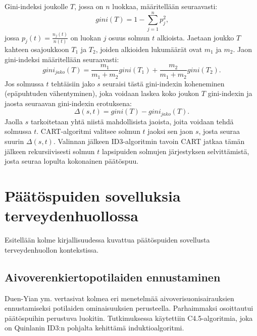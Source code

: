 \documentclass[12pt,finnish]{tktltiki2}
\theoremstyle{definition}
\theoremstyle{remark}
\begin{document}
Gini-indeksi joukolle $T$, jossa on $n$ luokkaa, määritellään seuraavasti:
\begin{equation*}
gini(T) = 1 -\sum_{j=1}^{n} p_j^2 \mbox{,}
\end{equation*}
jossa $p_j(t)=\frac{n_j(t)}{n(t)}$ on luokan $j$ osuus solmun $t$ alkioista. Jaetaan joukko $T$ kahteen osajoukkoon
$T_1$ ja $T_2$, joiden alkioiden lukumäärät ovat $m_1$ ja $m_2$. Jaon gini-indeksi määritellään seuraavasti:
\begin{equation*}
gini_{jako}(T) = \frac{m_1}{m_1+m_2}gini(T_1) + \frac{m_2}{m_1+m_2}gini(T_2) \mbox{.}
\end{equation*}
Jos solmussa $t$ tehtäisiin jako $s$ seuraisi tästä gini-indexin koheneminen (epäpuhtuden vähentyminen), joka voidaan
laskea koko joukon $T$ gini-indexin ja jaosta seuraavan gini-indexin erotuksena:
\begin{equation*}
\Delta(s,t) = gini(T) - gini_{jako}(T) \mbox{.}
\end{equation*}
Jaolla $s$ tarkoitetaan yhtä niistä mahdollisista jaoista, joita voidaan tehdä solmussa $t$.
CART-algoritmi valitsee solmun $t$ jaoksi sen jaon $s$, josta seuraa suurin $\Delta(s,t)$.
Valinnan jälkeen ID3-algoritmin tavoin CART jatkaa tämän jälkeen rekursiivisesti solmun $t$
lapsipuiden solmujen järjestyksen selvittämistä, josta seuraa lopulta kokonainen päätöspuu.






\section{Päätöspuiden sovelluksia terveydenhuollossa}
\label{sec:sovellukset_terveydenhuollossa}
Esitellään kolme kirjallisuudessa kuvattua päätöspuiden sovellusta terveydenhuollon kontekstissa.

\subsection{Aivoverenkiertopotilaiden ennustaminen}
Duen-Yian ym. \cite{predictiveModelCerebrovascularDisease} vertasivat kolmea eri menetelmää aivoverisuonisairauksien ennustamiseksi potilaiden ominaisuuksien
perusteella. Parhaimmaksi osoittautui päätöspuihin perustuva
luokitin. Tutkimuksessa käytettiin C4.5-algoritmia, joka on Quinlanin ID3:n pohjalta kehittämä induktioalgoritmi.
\end{document}
